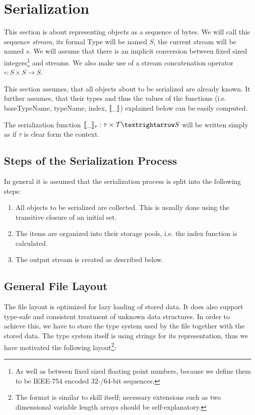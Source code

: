 \section{Serialization}
\label{serialization}

This section is about representing objects as a sequence of bytes. We will call this sequence \textit{stream}, its formal Type will be named $S$, the current stream will be named $s$. We will assume that there is an implicit conversion between fixed sized integers\footnote{As well as between fixed sized floating point numbers, because we define them to be IEEE-754 encoded 32-/64-bit sequences.} and streams. We also make use of a stream concatenation operator $\circ : S \times S → S$.

This section assumes, that all objects about to be serialized are already known. It further assumes, that their types and thus the values of the functions (i.e. baseTypeName, typeName, index, $[\![\_]\!]$) explained below can be easily computed.

The serialization function $\den{\_}_\tau : \tau \times \mathcal{T} → S$ will be written simply as \den{\_} if $\tau$ is clear form the context.


\subsection{Steps of the Serialization Process}

In general it is assumed that the serialization process is split into the following steps:
\begin{enumerate}
 \item All objects to be serialized are collected. This is usually done using the transitive closure of an initial set.
 
 \item The items are organized into their storage pools, i.e. the index function is calculated.
 
 \item The output stream is created as described below.
\end{enumerate}

\subsection{General File Layout}

The file layout is optimized for lazy loading of stored data. It does also support type-safe and consistent treatment of unknown data structures. In order to achieve this, we have to store the type system used by the file together with the stored data. The type system itself is using strings for its representation, thus we have motivated the following layout\footnote{The format is similar to skill itself; necessary extensions such as two dimensional variable length arrays should be self-explanatory.}:

